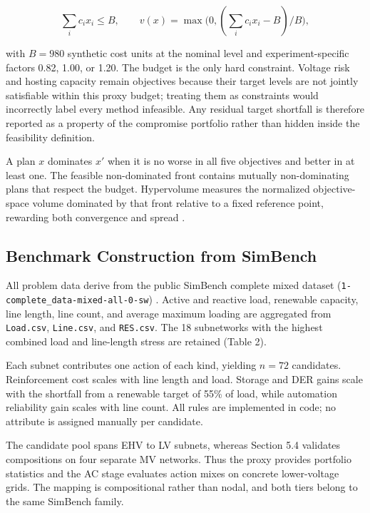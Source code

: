 \documentclass[energies,article,submit,moreauthors]{Definitions/mdpi}
\begin{document}
\[
\textstyle\sum_i c_i x_i \le B, \qquad v(x) = \max\big(0, (\textstyle\sum_i c_i x_i - B)/B\big),
\]

with \(B = 980\) synthetic cost units at the nominal level and experiment-specific factors 0.82, 1.00, or 1.20. The budget is the only hard constraint. Voltage risk and hosting capacity remain objectives because their target levels are not jointly satisfiable within this proxy budget; treating them as constraints would incorrectly label every method infeasible. Any residual target shortfall is therefore reported as a property of the compromise portfolio rather than hidden inside the feasibility definition.

A plan \(x\) dominates \(x'\) when it is no worse in all five objectives and better in at least one. The feasible non-dominated front contains mutually non-dominating plans that respect the budget. Hypervolume measures the normalized objective-space volume dominated by that front relative to a fixed reference point, rewarding both convergence and spread \cite{ref20}.

\subsection{Benchmark Construction from SimBench}\label{benchmark-construction-from-simbench}

All problem data derive from the public SimBench complete mixed dataset (\texttt{1-complete\_data-mixed-all-0-sw}) \cite{ref5}. Active and reactive load, renewable capacity, line length, line count, and average maximum loading are aggregated from \texttt{Load.csv}, \texttt{Line.csv}, and \texttt{RES.csv}. The 18 subnetworks with the highest combined load and line-length stress are retained (Table 2).

Each subnet contributes one action of each kind, yielding \(n=72\) candidates. Reinforcement cost scales with line length and load. Storage and DER gains scale with the shortfall from a renewable target of 55\% of load, while automation reliability gain scales with line count. All rules are implemented in code; no attribute is assigned manually per candidate.

The candidate pool spans EHV to LV subnets, whereas Section 5.4 validates compositions on four separate MV networks. Thus the proxy provides portfolio statistics and the AC stage evaluates action mixes on concrete lower-voltage grids. The mapping is compositional rather than nodal, and both tiers belong to the same SimBench family.
\end{document}
